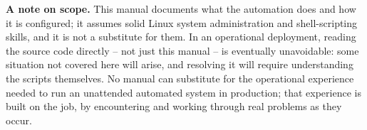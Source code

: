 \textbf{A note on scope.} This manual documents what the automation does and how it is configured; it
assumes solid Linux system administration and shell-scripting skills, and it is not a substitute for
them. In an operational deployment, reading the source code directly -- not just this manual -- is
eventually unavoidable: some situation not covered here will arise, and resolving it will require
understanding the scripts themselves. No manual can substitute for the operational experience needed to
run an unattended automated system in production; that experience is built on the job, by encountering
and working through real problems as they occur.
